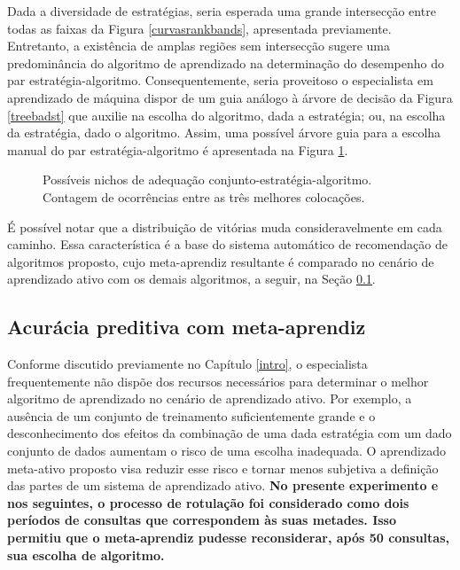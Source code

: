 Dada a diversidade de estratégias, seria esperada uma grande intersecção entre todas as faixas da Figura \ref{curvasrankbands}, apresentada previamente.
Entretanto, a existência de amplas regiões sem intersecção sugere uma predominância do algoritmo de aprendizado na determinação do desempenho do par estratégia-algoritmo.
Consequentemente, seria proveitoso o especialista em aprendizado de máquina dispor de um guia análogo à árvore de decisão da Figura \ref{treebadst} que auxilie na escolha do algoritmo, dada a estratégia; ou, na escolha da estratégia, dado o algoritmo.
Assim, uma possível árvore guia para a escolha manual do par estratégia-algoritmo é apresentada na Figura \ref{treegoodst}.
\begin{figure}
	\centering
	
	\caption[Possíveis nichos de adequação conjunto-estratégia-algoritmo.]{Possíveis nichos de adequação conjunto-estratégia-algoritmo. Contagem de ocorrências entre as três melhores colocações.}
	\label{treegoodst}
\end{figure}

É possível notar que a distribuição de vitórias muda consideravelmente em cada caminho.
Essa característica é a base do sistema automático de recomendação de algoritmos proposto, cujo meta-aprendiz resultante é comparado no cenário de aprendizado ativo com os demais algoritmos, a seguir, na Seção \ref{desmetap}.

\newpage
\subsection{Acurácia preditiva com meta-aprendiz}\label{desmetap}
Conforme discutido previamente no Capítulo \ref{intro}, o especialista frequentemente não dispõe dos recursos necessários para determinar o melhor algoritmo de aprendizado no cenário de aprendizado ativo.
Por exemplo, a ausência de um conjunto de treinamento suficientemente grande e o desconhecimento dos efeitos da combinação de uma dada estratégia com um dado conjunto de dados aumentam o risco de uma escolha inadequada.
O aprendizado meta-ativo proposto visa reduzir esse risco e tornar menos subjetiva a definição das partes de um sistema de aprendizado ativo.
\textbf{No presente experimento e nos seguintes, o processo de rotulação foi considerado como dois períodos de consultas que correspondem às suas metades.
Isso permitiu que o meta-aprendiz pudesse reconsiderar, após 50 consultas, sua escolha de algoritmo.}


